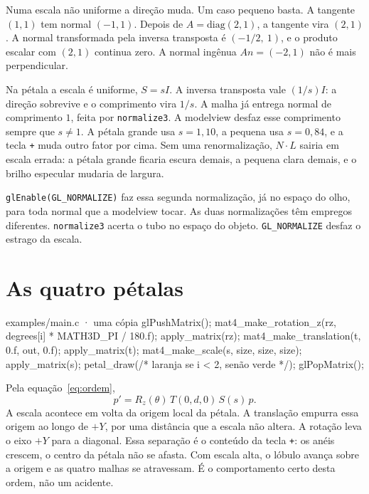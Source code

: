 \documentclass[11pt,a4paper]{article}
\newcommand{\fn}[1]{\texttt{\nobreak\hspace{0pt}#1}}
\begin{document}
Numa escala não uniforme a direção muda. Um caso pequeno basta. A tangente \((1, 1)\) tem normal \((-1, 1)\). Depois de \(A = \mathrm{diag}(2, 1)\), a tangente vira \((2, 1)\). A normal transformada pela inversa transposta é \((-1/2,\ 1)\), e o produto escalar com \((2, 1)\) continua zero. A normal ingênua \(A n = (-2, 1)\) não é mais perpendicular.

Na pétala a escala é uniforme, \(S = s I\). A inversa transposta vale \((1/s) I\): a direção sobrevive e o comprimento vira \(1/s\). A malha já entrega normal de comprimento \(1\), feita por \fn{normalize3}. A modelview desfaz esse comprimento sempre que \(s \neq 1\). A pétala grande usa \(s = 1{,}10\), a pequena usa \(s = 0{,}84\), e a tecla \fn{+} muda outro fator por cima. Sem uma renormalização, \(N\cdot L\) sairia em escala errada: a pétala grande ficaria escura demais, a pequena clara demais, e o brilho especular mudaria de largura.

\fn{glEnable(GL\_NORMALIZE)} faz essa segunda normalização, já no espaço do olho, para toda normal que a modelview tocar. As duas normalizações têm empregos diferentes. \fn{normalize3} acerta o tubo no espaço do objeto. \fn{GL\_NORMALIZE} desfaz o estrago da escala.

\section{As quatro pétalas}
\label{sec:petalas}

\begin{codigo}{examples/main.c · uma cópia}
glPushMatrix();
mat4_make_rotation_z(rz, degrees[i] * MATH3D_PI / 180.f);
apply_matrix(rz);
mat4_make_translation(t, 0.f, out, 0.f);
apply_matrix(t);
mat4_make_scale(s, size, size, size);
apply_matrix(s);
petal_draw(/* laranja se i < 2, senão verde */);
glPopMatrix();
\end{codigo}

Pela equação~\eqref{eq:ordem},
\begin{equation}
  p' = R_z(\theta)\, T(0, d, 0)\, S(s)\, p .
  \label{eq:petala}
\end{equation}
A escala acontece em volta da origem local da pétala. A translação empurra essa origem ao longo de \(+Y\), por uma distância que a escala não altera. A rotação leva o eixo \(+Y\) para a diagonal. Essa separação é o conteúdo da tecla \fn{+}: os anéis crescem, o centro da pétala não se afasta. Com escala alta, o lóbulo avança sobre a origem e as quatro malhas se atravessam. É o comportamento certo desta ordem, não um acidente.
\end{document}
